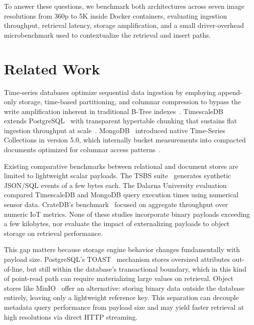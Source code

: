 \documentclass[conference, a4paper]{IEEEtran}
\begin{document}
To answer these questions, we benchmark both architectures across seven image resolutions from 360p to 5K inside Docker containers, evaluating ingestion throughput, retrieval latency, storage amplification, and a small driver-overhead microbenchmark used to contextualize the retrieval and insert paths.

\section{Related Work}
\label{sec:related_work}

Time-series databases optimize sequential data ingestion by employing append-only storage, time-based partitioning, and columnar compression to bypass the write amplification inherent in traditional B-Tree indexes~\cite{dewaal_timeseries_survey,jensen_tsms_survey}. TimescaleDB~\cite{timescaledb_official} extends PostgreSQL~\cite{postgresql_official} with transparent hypertable chunking that sustains flat ingestion throughput at scale~\cite{dewaal_timeseries_survey,nerc_tsdb_survey}. MongoDB~\cite{mongodb_official} introduced native Time-Series Collections in version 5.0, which internally bucket measurements into compacted documents optimized for columnar access patterns~\cite{tigerdata_mongodb_timescaledb,maddevs_timescaledb_beats_pg}.

Existing comparative benchmarks between relational and document stores are limited to lightweight scalar payloads. The TSBS suite~\cite{tsbs} generates synthetic JSON/SQL events of a few bytes each. The Dalarna University evaluation~\cite{diva_timescaledb_mongodb_eval} compared TimescaleDB and MongoDB query execution times using numerical sensor data. CrateDB's benchmark~\cite{cratedb_ts_benchmark} focused on aggregate throughput over numeric IoT metrics. None of these studies incorporate binary payloads exceeding a few kilobytes, nor evaluate the impact of externalizing payloads to object storage on retrieval performance.

This gap matters because storage engine behavior changes fundamentally with payload size. PostgreSQL's TOAST~\cite{postgresql_toast_docs} mechanism stores oversized attributes out-of-line, but still within the database's transactional boundary, which in this kind of point-read path can require materializing large values on retrieval. Object stores like MinIO~\cite{minio_official} offer an alternative: storing binary data outside the database entirely, leaving only a lightweight reference key. This separation can decouple metadata query performance from payload size and may yield faster retrieval at high resolutions via direct HTTP streaming.
\end{document}
